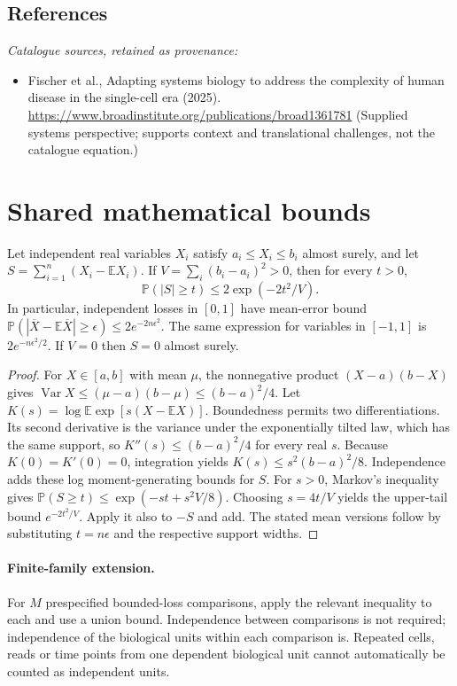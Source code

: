 \documentclass[11pt]{article}
\begin{document}
\subsection{References}
\noindent\emph{Catalogue sources, retained as provenance:}
\begin{itemize}
\item Fischer et al., Adapting systems biology to address the complexity of human disease in the single-cell era (2025). \url{https://www.broadinstitute.org/publications/broad1361781} (Supplied systems perspective; supports context and translational challenges, not the catalogue equation.)
\end{itemize}




\section{Shared mathematical bounds}\label{app:bounds}
\begin{lemma}\label{lem:bounded}
Let independent real variables $X_i$ satisfy $a_i\leq X_i\leq b_i$ almost surely,
and let $S=\sum_{i=1}^n(X_i-\mathbb{E} X_i)$. If
$V=\sum_i(b_i-a_i)^2>0$, then for every $t>0$,
\[
 \mathbb{P}(|S|\geq t)\leq 2\exp(-2t^2/V).
\]
In particular, independent losses in $[0,1]$ have mean-error bound
$\mathbb{P}(|\overline X-\mathbb{E}\overline X|\geq\epsilon)
\leq2e^{-2n\epsilon^2}$. The same expression for variables in $[-1,1]$
is $2e^{-n\epsilon^2/2}$. If $V=0$ then $S=0$ almost surely.
\end{lemma}
\begin{proof}
For $X\in[a,b]$ with mean $\mu$, the nonnegative product
$(X-a)(b-X)$ gives
$\operatorname{Var} X\leq(\mu-a)(b-\mu)\leq(b-a)^2/4$.
Let $K(s)=\log\mathbb{E}\exp[s(X-\mathbb{E} X)]$.
Boundedness permits two differentiations. Its second derivative is the variance
under the exponentially tilted law, which has the same support, so
$K''(s)\leq(b-a)^2/4$ for every real $s$.
Because $K(0)=K'(0)=0$, integration yields
$K(s)\leq s^2(b-a)^2/8$.
Independence adds these log moment-generating bounds for $S$.
For $s>0$, Markov's inequality gives
$\mathbb{P}(S\geq t)\leq\exp(-st+s^2V/8)$.
Choosing $s=4t/V$ yields the upper-tail bound $e^{-2t^2/V}$.
Apply it also to $-S$ and add. The stated mean versions follow by substituting
$t=n\epsilon$ and the respective support widths.
\end{proof}

\paragraph{Finite-family extension.}
For $M$ prespecified bounded-loss comparisons, apply the relevant inequality to
each and use a union bound. Independence between comparisons is not required;
independence of the biological units within each comparison is. Repeated cells,
reads or time points from one dependent biological unit cannot automatically be
counted as independent units.
\end{document}
